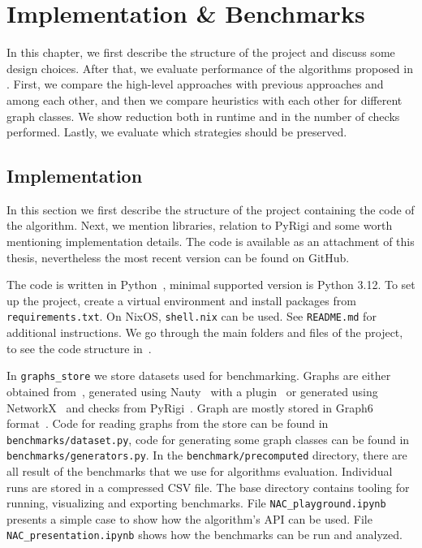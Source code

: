 \chapter{Implementation \& Benchmarks}%
\label{chapter:benchmarks}

\begin{chapterabstract}

	In this chapter, we first describe the structure of the project
	and discuss some design choices.
	After that, we evaluate performance of the algorithms
	proposed in .
	First, we compare the high-level approaches with previous approaches and among each other,
	and then we compare heuristics with each other
	for different  graph classes.
	We show reduction both in runtime and in the number
	of \IsNACColoring{} checks performed.
	Lastly, we evaluate which strategies should be preserved.

\end{chapterabstract}

\section{Implementation}

In this section we first describe the structure of the project containing
the code of the algorithm.
Next, we mention libraries, relation to PyRigi and
some worth mentioning implementation details.
The code is available as an attachment of this thesis,
nevertheless the most recent version can be found on
 GitHub.

The code is written in Python~\cite{python}, minimal supported version is Python 3.12.
To set up the project, create a virtual environment and install packages
from \texttt{requirements.txt}. On NixOS, \texttt{shell.nix} can be used.
See \texttt{README.md} for additional instructions.
We go through the main folders and files of the project,
to see the code structure in~.

In \texttt{graphs\_store} we store datasets used for benchmarking.
Graphs are either obtained from~\cite{extremal_graphs},
generated using Nauty~\cite{nauty} with a plugin~\cite{nauty_plugin}
or generated using NetworkX~\cite{networkx} and checks from PyRigi~\cite{pyrigi}.
Graph are mostly stored in Graph6 format~\cite{graph6}.
Code for reading graphs from the store can be found in \texttt{benchmarks/dataset.py},
code for generating some graph classes can be found in  \texttt{benchmarks/generators.py}.
In the \texttt{benchmark/precomputed} directory, there are all result of the benchmarks that
we use for algorithms evaluation.
Individual runs are stored in a compressed CSV file.
%
The base directory contains tooling for running, visualizing and exporting benchmarks.
File \texttt{NAC\_playground.ipynb} presents a simple case
to show how the algorithm's API can be used.
File \texttt{NAC\_presentation.ipynb} shows how the benchmarks can be run and analyzed.

